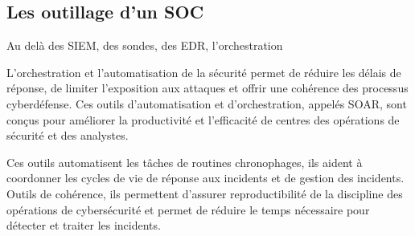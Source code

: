 

\subsection{Les outillage d'un SOC}

Au delà des SIEM, des sondes, des EDR, l'orchestration

L'orchestration et l'automatisation de la sécurité  permet de réduire les délais de réponse, de  limiter l'exposition aux attaques et offrir une cohérence des processus cyberdéfense. Ces  outils d’automatisation et d’orchestration,  appelés SOAR, sont conçus pour améliorer la productivité et l’efficacité de centres des opérations de sécurité et des analystes.

Ces outils automatisent les tâches de routines chronophages,  ils aident à coordonner les cycles de vie de réponse aux incidents et de gestion des incidents. Outils de  cohérence, ils permettent d'assurer reproductibilité de la discipline des opérations de cybersécurité et permet de réduire le temps nécessaire pour détecter et traiter les incidents.

